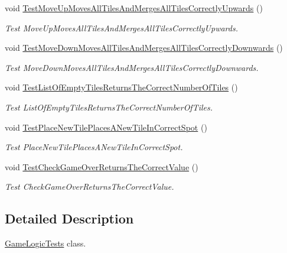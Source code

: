 \begin{DoxyCompactItemize}
void \mbox{\hyperlink{class_game_1_1_tests_1_1_game_logic_tests_ab0eaf9a305e88cad246c79e2f94e996b}{Test\+Move\+Up\+Moves\+All\+Tiles\+And\+Merges\+All\+Tiles\+Correctly\+Upwards}} ()
\begin{DoxyCompactList}\small\item\em Test Move\+Up\+Moves\+All\+Tiles\+And\+Merges\+All\+Tiles\+Correctly\+Upwards. \end{DoxyCompactList}\item 
void \mbox{\hyperlink{class_game_1_1_tests_1_1_game_logic_tests_a5a81f8b2e7d572d3ad2b879f67a22ccf}{Test\+Move\+Down\+Moves\+All\+Tiles\+And\+Merges\+All\+Tiles\+Correctly\+Downwards}} ()
\begin{DoxyCompactList}\small\item\em Test Move\+Down\+Moves\+All\+Tiles\+And\+Merges\+All\+Tiles\+Correctly\+Downwards. \end{DoxyCompactList}\item 
void \mbox{\hyperlink{class_game_1_1_tests_1_1_game_logic_tests_ac5b9e8c3adf167540ab6f5483f92ff82}{Test\+List\+Of\+Empty\+Tiles\+Returns\+The\+Correct\+Number\+Of\+Tiles}} ()
\begin{DoxyCompactList}\small\item\em Test List\+Of\+Empty\+Tiles\+Returns\+The\+Correct\+Number\+Of\+Tiles. \end{DoxyCompactList}\item 
void \mbox{\hyperlink{class_game_1_1_tests_1_1_game_logic_tests_a1ff4efb4b331cc873be402ad38ba07c9}{Test\+Place\+New\+Tile\+Places\+A\+New\+Tile\+In\+Correct\+Spot}} ()
\begin{DoxyCompactList}\small\item\em Test Place\+New\+Tile\+Places\+A\+New\+Tile\+In\+Correct\+Spot. \end{DoxyCompactList}\item 
void \mbox{\hyperlink{class_game_1_1_tests_1_1_game_logic_tests_a3fa73a274c2ac7865db08e69d1869ae1}{Test\+Check\+Game\+Over\+Returns\+The\+Correct\+Value}} ()
\begin{DoxyCompactList}\small\item\em Test Check\+Game\+Over\+Returns\+The\+Correct\+Value. \end{DoxyCompactList}\end{DoxyCompactItemize}


\subsection{Detailed Description}
\mbox{\hyperlink{class_game_1_1_tests_1_1_game_logic_tests}{Game\+Logic\+Tests}} class. 



